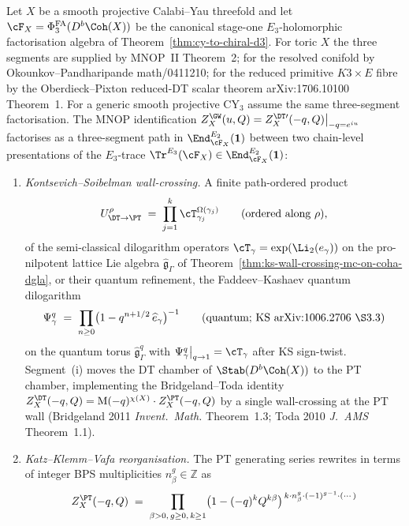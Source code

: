 \begin{theorem}
\label{thm:mnop-three-segment-homotopy}
Let $X$ be a smooth projective Calabi--Yau threefold and let
$\cF_X = \PhiFA_3(D^b\Coh(X))$ be the canonical stage-one $E_3$-holomorphic
factorisation algebra of Theorem~\ref{thm:cy-to-chiral-d3}. For toric
$X$ the three segments are supplied by MNOP~II Theorem~2; for the
resolved conifold by Okounkov--Pandharipande \textup{math/0411210};
for the reduced primitive $K3\times E$ fibre by the
Oberdieck--Pixton reduced-DT scalar theorem
\textup{arXiv:1706.10100} Theorem~1. For a generic smooth projective
CY$_3$ assume the same three-segment factorisation. The MNOP
identification
$Z^{\GW}_X(u, Q) = Z^{\DT\prime}_X(-q, Q)\big|_{-q = e^{iu}}$
factorises as a three-segment path in $\End^{E_2}_{\cF_X}(\mathbf{1})$
between two chain-level presentations of the $E_3$-trace
$\Tr^{E_3}(\cF_X) \in \End^{E_2}_{\cF_X}(\mathbf{1})$:
\begin{enumerate}[label=\textup{(\roman*)}]
\item \emph{Kontsevich--Soibelman wall-crossing.} A finite
 path-ordered product
 \[
 U^{\rho}_{\DT \to \PT}
 \;=\; \prod_{j=1}^{k} \cT_{\gamma_j}^{\Omega(\gamma_j)}
 \qquad (\text{ordered along } \rho),
 \]
 of the semi-classical dilogarithm operators
 $\cT_\gamma = \exp(\Li_2(e_\gamma))$ on the pro-nilpotent lattice Lie
 algebra $\widehat{\mathfrak{g}}_{\Gamma}$ of
 Theorem~\ref{thm:ks-wall-crossing-mc-on-coha-dgla}, or their quantum
 refinement, the Faddeev--Kashaev quantum dilogarithm
 \[
 \Psi^{q}_\gamma
 \;=\; \prod_{n\geq 0}\bigl(1 - q^{n+1/2}\,\widehat{e}_\gamma\bigr)^{-1}
 \qquad (\text{quantum; KS \textup{arXiv:1006.2706} \S3.3})
 \]
 on the quantum torus $\widehat{\mathfrak{g}}^{q}_{\Gamma}$ with
 $\Psi^{q}_\gamma\big|_{q \to 1} = \cT_\gamma$ after KS sign-twist.
 Segment~(i) moves the DT chamber of $\Stab(D^b\Coh(X))$ to the PT
 chamber, implementing the Bridgeland--Toda identity
 $Z^{\DT}_X(-q, Q) = \mathrm{M}(-q)^{\chi(X)} \cdot Z^{\PT}_X(-q, Q)$
 by a single wall-crossing at the PT wall (Bridgeland 2011
 \emph{Invent.~Math.} Theorem~1.3; Toda 2010 \emph{J.~AMS} Theorem~1.1).
\item \emph{Katz--Klemm--Vafa reorganisation.} The PT generating series
 rewrites in terms of integer BPS multiplicities
 $n^{g}_\beta \in \mathbb{Z}$ as
 \[
 Z^{\PT}_X(-q, Q)
 \;=\;
 \prod_{\beta > 0,\,g\geq 0,\,k\geq 1}
 \bigl(1 - (-q)^{k} Q^{k\beta}\bigr)^{\,k \cdot n^{g}_\beta \cdot (-1)^{g-1} \cdot (\cdots)}
 \]

\end{enumerate}
\end{theorem}
